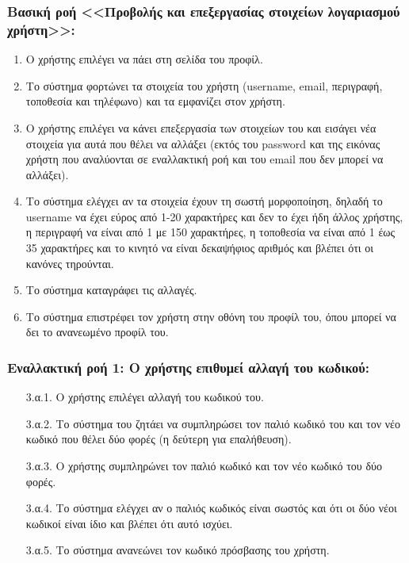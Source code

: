 \documentclass[12pt,a4paper]{article}
\begin{document}
\subsubsection*{Βασική ροή <<Προβολής και επεξεργασίας στοιχείων λογαριασμού \\χρήστη>>:}
\begin{enumerate}
    \item Ο χρήστης επιλέγει να πάει στη σελίδα του προφίλ. 
    \item Το σύστημα φορτώνει τα στοιχεία του χρήστη (username, email, περιγραφή, τοποθεσία και τηλέφωνο) και τα εμφανίζει στον χρήστη.
    \item Ο χρήστης επιλέγει να κάνει επεξεργασία των στοιχείων του και εισάγει νέα στοιχεία για αυτά που θέλει να αλλάξει (εκτός του password και της εικόνας χρήστη που αναλύονται σε εναλλακτική ροή και του email που δεν μπορεί να αλλάξει). 
    \item Το σύστημα ελέγχει αν τα στοιχεία έχουν τη σωστή μορφοποίηση, δηλαδή το username να έχει εύρος από 1-20 χαρακτήρες και δεν το έχει ήδη άλλος χρήστης, η περιγραφή να είναι από 1 με 150 χαρακτήρες, η τοποθεσία να είναι από 1 έως 35 χαρακτήρες και το κινητό να είναι δεκαψήφιος αριθμός και βλέπει ότι οι κανόνες τηρούνται.
    \item Το σύστημα καταγράφει τις αλλαγές.
    \item Το σύστημα επιστρέφει τον χρήστη στην οθόνη του προφίλ του, όπου μπορεί να δει το ανανεωμένο προφίλ του.
\end{enumerate}

\subsubsection*{Εναλλακτική ροή 1: Ο χρήστης επιθυμεί αλλαγή του κωδικού:}
\begin{enumerate}
    \item [3.α.1.] Ο χρήστης επιλέγει αλλαγή του κωδικού του. 
    \item [3.α.2.] Το σύστημα του ζητάει να συμπληρώσει τον παλιό κωδικό του και τον νέο κωδικό που θέλει δύο φορές (η δεύτερη για επαλήθευση).
    \item [3.α.3.] Ο χρήστης συμπληρώνει τον παλιό κωδικό και τον νέο κωδικό του δύο φορές.
    \item [3.α.4.] Το σύστημα ελέγχει αν ο παλιός κωδικός είναι σωστός και ότι οι δύο νέοι κωδικοί είναι ίδιο και βλέπει ότι αυτό ισχύει.
    \item [3.α.5.] Το σύστημα ανανεώνει τον κωδικό πρόσβασης του χρήστη.
\end{enumerate}
\end{document}
